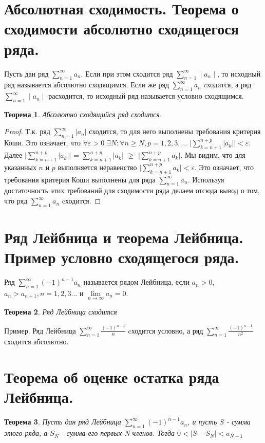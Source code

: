 \documentclass[12pt, a4paper]{article}
\newtheorem{thm}{Теорема}
\begin{document}
\section{Абсолютная сходимость. Теорема о сходимости абсолютно сходящегося ряда.}
Пусть дан ряд  $\sum\limits_{n=1}^{\infty}a_n$. Если при этом сходится ряд $\sum\limits_{n=1}^{\infty}\mid a_n \mid$, то исходный ряд называется абсолютно сходящимся. Если же ряд $\sum\limits_{n=1}^{\infty}a_n$ cходится, а ряд  $\sum\limits_{n=1}^{\infty}\mid a_n \mid$ расходится, то исходный ряд называется условно сходящимся.  
\begin{thm}
	Абсолютно сходящийся ряд сходится.
\end{thm}
\begin{proof}
	Т.к. ряд $\sum\limits_{n=1}^{\infty}|a_n|$ сходится, то для него выполнены требования критерия Коши. Это означает, что $\forall \varepsilon > 0$ $\exists N : \forall n \geq N, p = 1, 2, 3, ...$  $\bigg| \sum\limits_{k=n+1}^{n + p}|a_k| \bigg| < \varepsilon$. Далее $\bigg| \sum\limits_{k=n+1}^{n + p}|a_k| \bigg|$ = $\sum\limits_{k=n+1}^{n + p}|a_k| $ $ \geq $ $ \bigg| \sum\limits_{k=n+1}^{n + p}a_k \bigg| $. Мы видим, что для указанных $n$ и $p$ выполняется неравенство $\bigg| \sum\limits_{k=n+1}^{n + p}a_k \bigg| < \varepsilon$. Это означает, что требования критерия Коши выполнены для ряда $\sum\limits_{n=1}^{\infty}a_n$. Используя достаточность этих требований для сходимости ряда делаем отсюда вывод о том, что ряд $\sum\limits_{n=1}^{\infty}a_n$ cходится.
\end{proof}
\section{Ряд Лейбница и теорема Лейбница. Пример условно сходящегося ряда.}
Ряд  $\sum_{n=1}^{\infty}(-1)^{n-1}a_n$ называется рядом Лейбница, если $a_n > 0$, $a_n > a_{n+1}, n = 1, 2, 3...$ и 
$\lim\limits_{n \to \infty}a_n = 0$.
\begin{thm}
Ряд Лейбница сходится
\end{thm}
Пример. Ряд Лейбница $\sum\limits_{n=1}^{\infty}\frac{(-1)^{n - 1}}{n}$ cходится условно, а ряд  $\sum\limits_{n=1}^{\infty}\frac{(-1)^{n - 1}}{n^2}$ сходится абсолютно.


\section{Теорема об оценке остатка ряда Лейбница.}
\begin{thm}
	Пусть дан ряд Лейбница $\sum\limits_{n=1}^{\infty}\left( -1 \right)^{n-1}a_n $, и пусть $S$ - сумма этого ряда, а $S_N$ - сумма его первых N членов. Тогда $0 < |S - S_N| < a_{N + 1}$ 
\end{thm}
\end{document}
